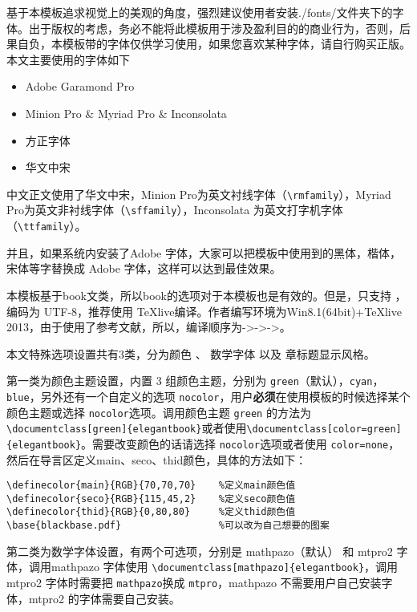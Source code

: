 \documentclass[color=green,mathpazo,titlestyle=hang]{elegantbook}
\begin{document}
基于本模板追求视觉上的美观的角度，强烈建议使用者安装./fonts/文件夹下的字体。出于版权的考虑，务必不能将此模板用于涉及盈利目的的商业行为，否则，后果自负，本模板带的字体仅供学习使用，如果您喜欢某种字体，请自行购买正版。本文主要使用的字体如下
\begin{itemize}
\itemsep=3pt
\parskip=0pt
\item Adobe Garamond Pro
\item Minion Pro \& Myriad Pro  \& Inconsolata
\item 方正字体
\item 华文中宋
\end{itemize}

\begin{note}
中文正文使用了华文中宋，Minion Pro为英文衬线字体（\verb|\rmfamily|），Myriad Pro为英文非衬线字体（\verb|\sffamily|），Inconsolata 为英文打字机字体（\verb|\ttfamily|）。

并且，如果系统内安装了Adobe 字体，大家可以把模板中使用到的黑体，楷体，宋体等字替换成 Adobe 字体，这样可以达到最佳效果。
\end{note}

本模板基于book文类，所以book的选项对于本模板也是有效的。但是，只支持 \XeLaTeX{}，编码为 UTF-8，推荐使用 \TeX{}live编译。作者编写环境为Win8.1(64bit)+\TeX{}live 2013，由于使用了参考文献，所以，编译顺序为\XeLaTeX->\BibTeX->\XeLaTeX->\XeLaTeX。

本文特殊选项设置共有3类，分为{\color{main}颜色} 、{\color{main} 数学字体 }以及{\color{main} 章标题显示风格}。

第一类为{\color{main}颜色}主题设置，内置 3 组颜色主题，分别为 \verb|green|（默认），\verb|cyan|，\verb|blue|，另外还有一个自定义的选项 \verb|nocolor|，用户\textbf{必须}在使用模板的时候选择某个颜色主题或选择 \verb|nocolor|选项。调用颜色主题 \verb|green| 的方法为\verb|\documentclass[green]{elegantbook}|或者使用\verb|\documentclass[color=green]{elegantbook}|。需要改变颜色的话请选择 \verb|nocolor|选项或者使用 \verb|color=none|，然后在导言区定义main、seco、thid颜色，具体的方法如下：
\begin{verbatim}
\definecolor{main}{RGB}{70,70,70}    %定义main颜色值
\definecolor{seco}{RGB}{115,45,2}    %定义seco颜色值
\definecolor{thid}{RGB}{0,80,80}     %定义thid颜色值
\base{blackbase.pdf}                 %可以改为自己想要的图案
\end{verbatim}

第二类为{\color{main}数学字体}设置，有两个可选项，分别是 mathpazo（默认） 和 mtpro2 字体，调用mathpazo 字体使用 \verb|\documentclass[mathpazo]{elegantbook}|，调用 mtpro2 字体时需要把 \verb|mathpazo|换成 \verb|mtpro|，mathpazo 不需要用户自己安装字体，mtpro2 的字体需要自己安装。
\end{document}
